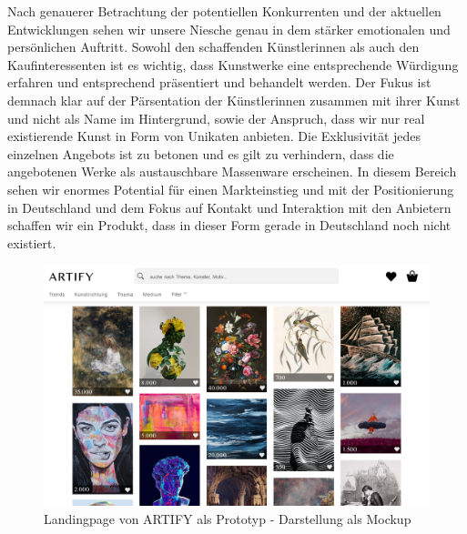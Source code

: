 \documentclass[11pt,a4paper]{report}
\begin{document}
Nach genauerer Betrachtung der potentiellen Konkurrenten und der aktuellen Entwicklungen sehen wir unsere Niesche genau in dem stärker emotionalen und persönlichen Auftritt. Sowohl den schaffenden Künstlerinnen als auch den Kaufinteressenten ist es wichtig, dass Kunstwerke eine entsprechende Würdigung erfahren und entsprechend präsentiert und behandelt werden. Der Fukus ist demnach klar auf der Pärsentation der Künstlerinnen zusammen mit ihrer Kunst und nicht als Name im Hintergrund, sowie der Anspruch, dass wir nur real existierende Kunst in Form von Unikaten anbieten. Die Exklusivität jedes einzelnen Angebots ist zu betonen und es gilt zu verhindern, dass die angebotenen Werke als austauschbare Massenware erscheinen. In diesem Bereich sehen wir enormes Potential für einen Markteinstieg und mit der Positionierung in Deutschland und dem Fokus auf Kontakt und Interaktion mit den Anbietern schaffen wir ein Produkt, dass in dieser Form gerade in Deutschland noch nicht existiert.

\begin{figure}[htb]
    \includegraphics[width=1\textwidth]{artify-01.png}
    \caption{Landingpage von ARTIFY als Prototyp - Darstellung als Mockup}
    \label{3_2}
\end{figure}
\end{document}
